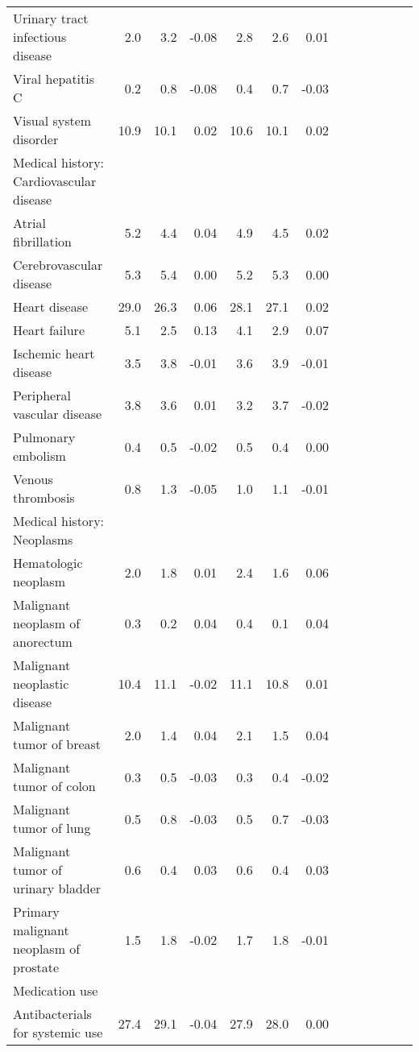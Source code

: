 \documentclass[11pt,]{article}
\begin{document}
\begin{longtable}{lrrrrrrrrrrrr}
      Urinary tract infectious disease &  2.0 &  3.2 & -0.08 &  2.8 &  2.6 &  0.01 \\ 
      Viral hepatitis C &  0.2 &  0.8 & -0.08 &  0.4 &  0.7 & -0.03 \\ 
      Visual system disorder & 10.9 & 10.1 &  0.02 & 10.6 & 10.1 &  0.02 \\ 
  Medical history: Cardiovascular disease &    &    &     &    &    &     \\ 
      Atrial fibrillation &  5.2 &  4.4 &  0.04 &  4.9 &  4.5 &  0.02 \\ 
      Cerebrovascular disease &  5.3 &  5.4 &  0.00 &  5.2 &  5.3 &  0.00 \\ 
      Heart disease & 29.0 & 26.3 &  0.06 & 28.1 & 27.1 &  0.02 \\ 
      Heart failure &  5.1 &  2.5 &  0.13 &  4.1 &  2.9 &  0.07 \\ 
      Ischemic heart disease &  3.5 &  3.8 & -0.01 &  3.6 &  3.9 & -0.01 \\ 
      Peripheral vascular disease &  3.8 &  3.6 &  0.01 &  3.2 &  3.7 & -0.02 \\ 
      Pulmonary embolism &  0.4 &  0.5 & -0.02 &  0.5 &  0.4 &  0.00 \\ 
      Venous thrombosis &  0.8 &  1.3 & -0.05 &  1.0 &  1.1 & -0.01 \\ 
  Medical history: Neoplasms &    &    &     &    &    &     \\ 
      Hematologic neoplasm &  2.0 &  1.8 &  0.01 &  2.4 &  1.6 &  0.06 \\ 
      Malignant neoplasm of anorectum &  0.3 &  0.2 &  0.04 &  0.4 &  0.1 &  0.04 \\ 
      Malignant neoplastic disease & 10.4 & 11.1 & -0.02 & 11.1 & 10.8 &  0.01 \\ 
      Malignant tumor of breast &  2.0 &  1.4 &  0.04 &  2.1 &  1.5 &  0.04 \\ 
      Malignant tumor of colon &  0.3 &  0.5 & -0.03 &  0.3 &  0.4 & -0.02 \\ 
      Malignant tumor of lung &  0.5 &  0.8 & -0.03 &  0.5 &  0.7 & -0.03 \\ 
      Malignant tumor of urinary bladder &  0.6 &  0.4 &  0.03 &  0.6 &  0.4 &  0.03 \\ 
      Primary malignant neoplasm of prostate &  1.5 &  1.8 & -0.02 &  1.7 &  1.8 & -0.01 \\ 
  Medication use &    &    &     &    &    &     \\ 
      Antibacterials for systemic use & 27.4 & 29.1 & -0.04 & 27.9 & 28.0 &  0.00 \\ 

\end{longtable}
\end{document}
